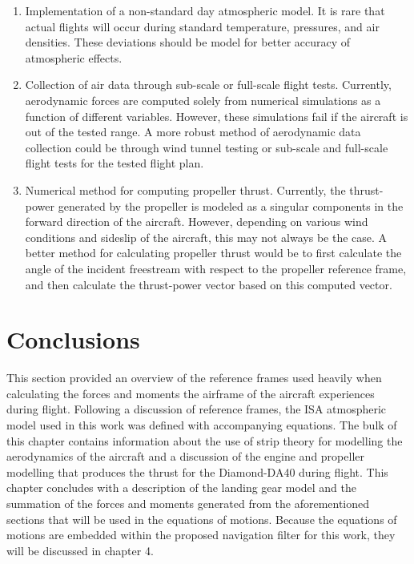 \begin{enumerate}
    \item Implementation of a non-standard day atmospheric model. It is rare that actual flights will occur during standard temperature, pressures, and air densities. These deviations should be model for better accuracy of atmospheric effects.

    \item Collection of air data through sub-scale or full-scale flight tests. Currently, aerodynamic forces are computed solely from numerical simulations as a function of different variables. However, these simulations fail if the aircraft is out of the tested range. A more robust method of aerodynamic data collection could be through wind tunnel testing or sub-scale and full-scale flight tests for the tested flight plan.

    \item Numerical method for computing propeller thrust. Currently, the thrust-power generated by the propeller is modeled as a singular components in the forward direction of the aircraft. However, depending on various wind conditions and sideslip of the aircraft, this may not always be the case. A better method for calculating propeller thrust would be to first calculate the angle of the incident freestream with respect to the propeller reference frame, and then calculate the thrust-power vector based on this computed vector.
\end{enumerate}


\section{\textbf{Conclusions}}

This section provided an overview of the reference frames used heavily when calculating the forces and moments the airframe of the aircraft experiences during flight. Following a discussion of reference frames, the ISA atmospheric model used in this work was defined with accompanying equations. The bulk of this chapter contains information about the use of strip theory for modelling the aerodynamics of the aircraft and a discussion of the engine and propeller modelling that produces the thrust for the Diamond-DA40 during flight. This chapter concludes with a description of the landing gear model and the summation of the forces and moments generated from the aforementioned sections that will be used in the equations of motions. Because the equations of motions are embedded within the proposed navigation filter for this work, they will be discussed in chapter 4.
\clearpage
